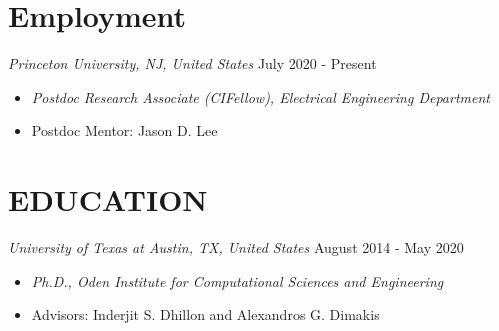 \documentclass[margin, 10pt]{res} %
\begin{document}
\begin{resume}

 






\section{Employment}
  {\sl Princeton University, NJ, United States} \hfill July 2020 - Present
  \begin{itemize}
    \item {\sl Postdoc Research Associate (CIFellow), Electrical Engineering Department }
    \item Postdoc Mentor: Jason D. Lee
  \end{itemize}


\section{EDUCATION}
{\sl University of Texas at Austin, TX, United States} \hfill August 2014 - May 2020
\begin{itemize}
\item {\sl Ph.D., Oden Institute for Computational Sciences and Engineering} 
\item Advisors: Inderjit S. Dhillon and Alexandros 
  G. Dimakis  
\end{itemize} 




\end{resume}
\end{document}
